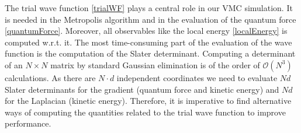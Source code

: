 \documentclass[english, a4paper]{article}
\begin{document}
The trial wave function \eqref{trialWF} plays a central role in our VMC simulation.
It is needed in the Metropolis algorithm and in the evaluation of the quantum force \eqref{quantumForce}.
Moreover, all observables like the local energy \eqref{localEnergy} is computed w.r.t. it. 
The most time-consuming part of the evaluation of the wave function is the computation of the Slater determinant. 
Computing a determinant of an $ N \times N$ matrix by standard Gaussian elimination is of the order of
$\mathcal{O}(N^3)$ calculations. As there are $N \cdot d$ independent coordinates we need to 
evaluate $Nd$ Slater determinants for the gradient (quantum force and kinetic energy) and $Nd$ for 
the Laplacian (kinetic energy). Therefore, it is imperative to find alternative ways of computing
the quantities related to the trial wave function to improve performance. \\
\end{document}
